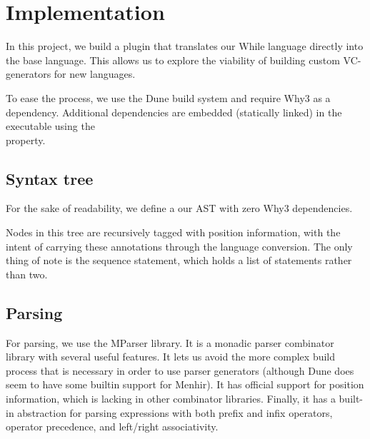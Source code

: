 \section{Implementation} %


In this project,
we build a plugin that translates our While language directly into the base language.
This allows us to explore the viability of building custom VC-generators for new languages.

To ease the process, we use the Dune build system\cite{dunesite} and require Why3 as a dependency.
Additional dependencies are embedded (statically linked) in the executable
using the\\ %
 property.

\subsection{Syntax tree}

For the sake of readability,
we define a our AST with zero Why3 dependencies.

Nodes in this tree are recursively tagged with position information,
with the intent of carrying these annotations through the language conversion.
The only thing of note is the sequence statement,
which holds a list of statements rather than two.

\subsection{Parsing}

For parsing, we use the MParser library\cite{mparser}.
It is a monadic parser combinator library with several useful features.
It lets us avoid the more complex build process
that is necessary in order to use parser generators
(although Dune does seem to have some builtin support for Menhir).
It has official support for position information,
which is lacking in other combinator libraries.
Finally, it has a built-in abstraction for parsing expressions with both prefix and infix operators,
operator precedence, and left/right associativity.

